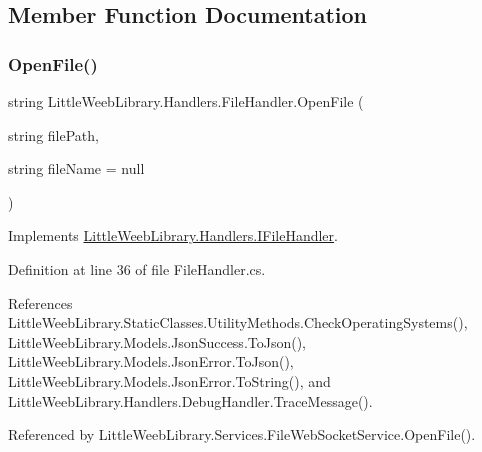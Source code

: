 \subsection{Member Function Documentation}
\mbox{\label{class_little_weeb_library_1_1_handlers_1_1_file_handler_a08cbef4974d973035a7ddeedb9f8ff4a}} 
\subsubsection{\texorpdfstring{Open\+File()}{OpenFile()}}
{\footnotesize\ttfamily string Little\+Weeb\+Library.\+Handlers.\+File\+Handler.\+Open\+File (\begin{DoxyParamCaption}\item[{string}]{file\+Path,  }\item[{string}]{file\+Name = {\ttfamily null} }\end{DoxyParamCaption})}



Implements \mbox{\hyperlink{interface_little_weeb_library_1_1_handlers_1_1_i_file_handler_a135124a2374dc64f5c64fdc4ff9eb049}{Little\+Weeb\+Library.\+Handlers.\+I\+File\+Handler}}.



Definition at line 36 of file File\+Handler.\+cs.



References Little\+Weeb\+Library.\+Static\+Classes.\+Utility\+Methods.\+Check\+Operating\+Systems(), Little\+Weeb\+Library.\+Models.\+Json\+Success.\+To\+Json(), Little\+Weeb\+Library.\+Models.\+Json\+Error.\+To\+Json(), Little\+Weeb\+Library.\+Models.\+Json\+Error.\+To\+String(), and Little\+Weeb\+Library.\+Handlers.\+Debug\+Handler.\+Trace\+Message().



Referenced by Little\+Weeb\+Library.\+Services.\+File\+Web\+Socket\+Service.\+Open\+File().


